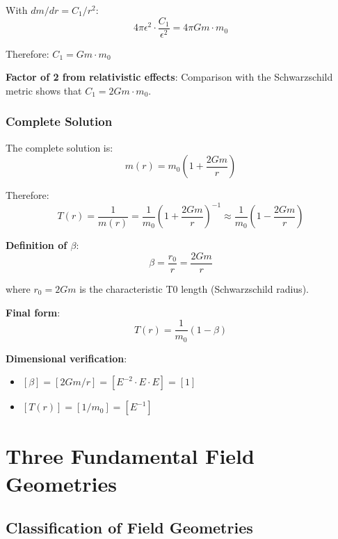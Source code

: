 \documentclass[12pt,a4paper]{article}
\begin{document}
	With $dm/dr = C_1/r^2$:
	\begin{equation}
		4\pi \epsilon^2 \cdot \frac{C_1}{\epsilon^2} = 4\pi G m \cdot m_0
	\end{equation}
	
	Therefore: $C_1 = G m \cdot m_0$
	
	\textbf{Factor of 2 from relativistic effects}: Comparison with the Schwarzschild metric shows that $C_1 = 2G m \cdot m_0$.
	
	\subsubsection{Complete Solution}
	\label{subsubsec:complete_solution}
	
	The complete solution is:
	\begin{equation}
		m(r) = m_0\left(1 + \frac{2Gm}{r}\right)
	\end{equation}
	
	Therefore:
	\begin{equation}
		T(r) = \frac{1}{m(r)} = \frac{1}{m_0}\left(1 + \frac{2Gm}{r}\right)^{-1} \approx \frac{1}{m_0}\left(1 - \frac{2Gm}{r}\right)
	\end{equation}
	
	\textbf{Definition of $\beta$}:
	\begin{equation}
		\boxed{\beta = \frac{r_0}{r} = \frac{2Gm}{r}}
	\end{equation}
	
	where $r_0 = 2Gm$ is the characteristic T0 length (Schwarzschild radius).
	
	\textbf{Final form}:
	\begin{equation}
		\boxed{T(r) = \frac{1}{m_0}(1 - \beta)}
	\end{equation}
	
	\textbf{Dimensional verification}:
	\begin{itemize}
		\item $[\beta] = [2Gm/r] = [E^{-2} \cdot E \cdot E] = [1]$ \checkmark
		\item $[T(r)] = [1/m_0] = [E^{-1}]$ \checkmark
	\end{itemize}
	
	\section{Three Fundamental Field Geometries}
	\label{sec:three_geometries}
	
	\subsection{Classification of Field Geometries}
	\label{subsec:geometry_classification}
	
\end{document}
